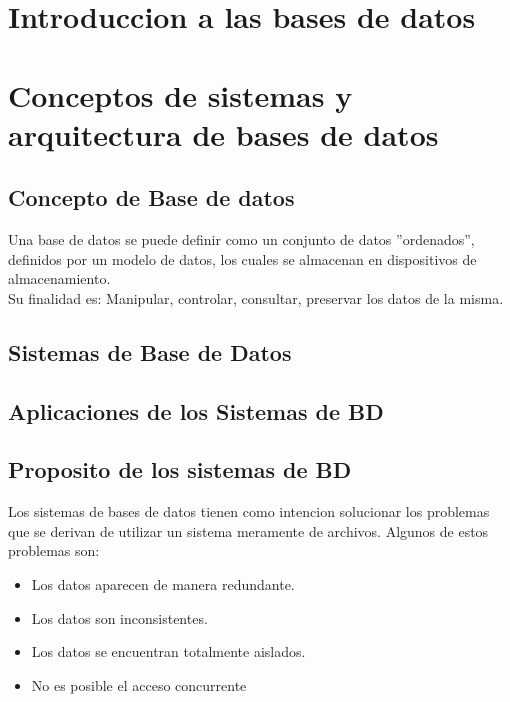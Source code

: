 \documentclass[twoside]{article}
\begin{document}
\selectfont
\tableofcontents
\newpage
\cleardoublepage
\section{Introduccion a las bases de datos}

\section{Conceptos de sistemas y arquitectura de bases de datos}

\subsection{Concepto de Base de datos}

Una base de datos se puede definir como un conjunto de datos ''ordenados'', definidos por un modelo de datos, los cuales se almacenan en dispositivos de almacenamiento.\\

Su finalidad es: Manipular, controlar, consultar, preservar los datos de la misma.

\subsection{Sistemas de Base de Datos} %
\subsection{Aplicaciones de los Sistemas de BD}

\subsection{Proposito de los sistemas de BD}

Los sistemas de bases de datos tienen como intencion solucionar los problemas que se derivan de utilizar un sistema meramente de archivos.
Algunos de estos problemas son:

\begin{itemize}
  \item Los datos aparecen de manera redundante.
  \item Los datos son inconsistentes.
  \item Los datos se encuentran totalmente aislados.
  \item No es posible el acceso concurrente
\end{itemize}
\end{document}
